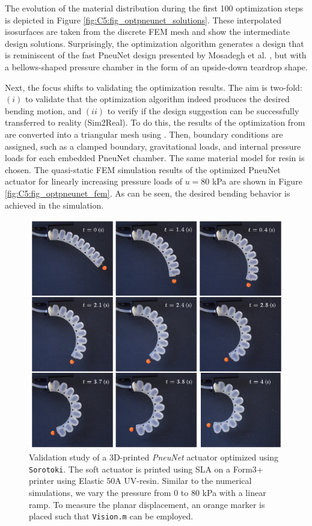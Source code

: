 The evolution of the material distribution during the first 100 optimization steps is depicted in Figure \ref{fig:C5:fig_optpneunet_solutions}. These interpolated isosurfaces are taken from the discrete FEM mesh and show the intermediate design solutions. Surprisingly, the optimization algorithm generates a design that is reminiscent of the fast PneuNet design presented by Mosadegh et al. \cite{Mosadegh2014}, but with a bellows-shaped pressure chamber in the form of an upside-down teardrop shape.

Next, the focus shifts to validating the optimization results. The aim is two-fold: $(i)$ to validate that the optimization algorithm indeed produces the desired bending motion, and $(ii)$ to verify if the design suggestion can be successfully transferred to reality (Sim2Real). To do this, the results of the optimization from  are converted into a triangular mesh using . Then, boundary conditions are assigned, such as a clamped boundary, gravitational loads, and internal pressure loads for each embedded PneuNet chamber. The same material model for  resin is chosen. The quasi-static FEM simulation results of the optimized PneuNet actuator for linearly increasing pressure loads of $u = 80$ \si{\kilo \pascal} are shown in Figure \ref{fig:C5:fig_optpneunet_fem}. As can be seen, the desired bending behavior is achieved in the simulation.

\begin{figure}[!t]
    \centering
    \includegraphics*[width=.825\textwidth]{./pdf/thesis-figure-6-24.pdf}
    \caption{\small Validation study of a 3D-printed \textit{PneuNet} actuator optimized using \texttt{Sorotoki}. The soft actuator is printed using SLA on a Form3+ printer using Elastic 50A UV-resin. Similar to the numerical simulations, we vary the pressure from 0 to 80 \si{\kilo \pascal} with a linear ramp. To measure the planar displacement, an orange marker is placed such that \texttt{Vision.m} can be employed.}
    \label{fig:C5:fig_optpneunet_exp}
\end{figure}

